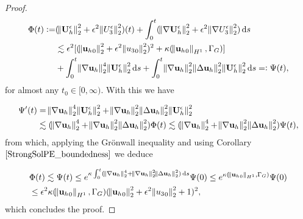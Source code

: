 \documentclass[12pt]{report}
\numberwithin{theorem}{chapter}
\numberwithin{corollary}{chapter}
\numberwithin{lemma}{chapter}
\numberwithin{remark}{chapter}
\numberwithin{definition}{chapter}
\numberwithin{prop}{chapter}
\newcommand*\diff{\mathop{}\!\mathrm{d}}
\begin{document}
\begin{proof}
\begin{equation}
  \begin{split} \nonumber
  \Phi (t):= & (\norm{\mathbf{U}_h^\epsilon}_2^2 + \epsilon^2 \norm{U_3^\epsilon}_2^2)(t) + \int_0^t (\norm{\nabla \mathbf{U}_h^\epsilon}_2^2 + \epsilon^2 \norm{\nabla U_3^\epsilon}_2^2) \diff s \\
  & \lesssim \epsilon^2 [(\norm{{\mathbf{u}_h}_0}_2^2 + \epsilon^2 \norm{{u_3}_0}_2^2)^2 + \kappa (\norm{{\mathbf{u}_h}_0}_{H^1}, \Gamma_G)] \\
  & + \int_0^{t} \norm{\nabla \mathbf{u}_h}_2^4 \norm{\mathbf{U}_h^\epsilon}_2^2 \diff s + \int_0^{t} \norm{\nabla \mathbf{u}_h}_2^2  \norm{\Delta \mathbf{u}_h}_2^2 \norm{\mathbf{U}_h^\epsilon}_2^2 \diff s =: \Psi(t),
  \end{split}
\end{equation}
%
for almost any $t_0 \in [0, \infty).$ With this we have

\begin{equation}
  \begin{split} \nonumber
   \Psi'(t) & = \norm{\nabla \mathbf{u}_h}_2^4 \norm{\mathbf{U}_h^\epsilon}_2^2 + \norm{\nabla \mathbf{u}_h}_2^2  \norm{\Delta \mathbf{u}_h}_2^2 \norm{\mathbf{U}_h^\epsilon}_2^2 \\
   & \lesssim (\norm{\nabla \mathbf{u}_h}_2^4 + \norm{\nabla \mathbf{u}_h}_2^2  \norm{\Delta \mathbf{u}_h}_2^2) \Phi (t) \lesssim (\norm{\nabla \mathbf{u}_h}_2^4 + \norm{\nabla \mathbf{u}_h}_2^2  \norm{\Delta \mathbf{u}_h}_2^2)\Psi(t),
  \end{split}
\end{equation}
%
from which, applying the Gr\"onwall inequality and using Corollary $\ref{StrongSolPE_boundedness}$ we deduce

\begin{equation}
  \begin{split} \nonumber
    & \Phi (t) \lesssim \Psi (t) \leq e^{\kappa \int_0 ^ t (\norm{\nabla \mathbf{u}_h}_2^4 + \norm{\nabla \mathbf{u}_h}_2^2  \norm{\Delta \mathbf{u}_h}_2^2) \diff s} \Psi (0) \leq e^{\kappa(\norm{{\mathbf{u}_h}_0}_{H^1}, \Gamma_G)} \Psi(0) \\
    & \leq \epsilon^2 \kappa (\norm{{\mathbf{u}_h}_0}_{H^1}, \Gamma_G) (\norm{{\mathbf{u}_h}_0}_2^2 + \epsilon^2 \norm{{u_3}_0}_2^2 + 1)^2,
  \end{split}
\end{equation}
%
which concludes the proof.
  
\end{proof}
\end{document}
